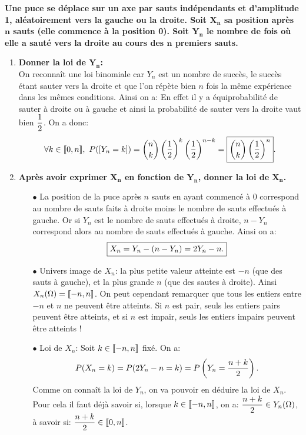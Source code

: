 \documentclass[a4paper, 11pt,reqno]{article}
\begin{document}
\begin{correction}  \;
	\textbf{Une puce se d\'eplace sur un axe par sauts ind\'ependants et d'amplitude 1, al\'eatoirement vers la gauche ou la droite. Soit $\mathbf{X_n}$ sa position apr\`es $\mathbf{n}$ sauts (elle commence \`a la position 0). Soit $\mathbf{Y_n}$ le nombre de fois o\`u elle a saut\'e vers la droite au cours des $\mathbf{n}$ premiers sauts.}
	\begin{enumerate}
		\item \textbf{Donner la loi de $\mathbf{Y_n}$:}\\
		      \noindent On reconna\^{i}t une loi binomiale car $Y_n$ est un nombre de succ\`{e}s, le succ\`{e}s \'etant sauter vers la droite et que l'on r\'ep\`{e}te bien $n$ fois la m\^{e}me exp\'erience dans les m\^{e}mes conditions. Ainsi on a:  En effet il y a \'equiprobabilit\'e de sauter \`{a} droite ou \`{a} gauche et ainsi la probabilit\'e de sauter vers la droite vaut bien $\displaystyle\frac{1}{2}$. On a donc:
		      $$\forall k\in\llbracket  0,n\rrbracket,\ P(\lbrack Y_n=k\rbrack)=\binom{n}{k} \left( \displaystyle\frac{1}{2} \right)^k \left( \displaystyle\frac{1}{2} \right)^{n-k}=\fbox{$\displaystyle\binom{n}{k} \left( \displaystyle\frac{1}{2} \right)^n$}.$$
		\item \textbf{Apr\`es avoir exprimer $\mathbf{X_n}$ en fonction de $\mathbf{Y_n}$, donner la loi de $\mathbf{X_n}$.}
		      \begin{itemize}
			      \item[$\bullet$] La position de la puce apr\`{e}s $n$ sauts en ayant commenc\'e \`{a} 0 correspond au nombre de sauts faits \`{a} droite moins le nombre de sauts effectu\'es \`{a} gauche. Or si $Y_n$ est le nombre de sauts effectu\'es \`{a} droite, $n-Y_n$ correspond alors au nombre de sauts effectu\'es \`{a} gauche. Ainsi on a:
				      $$\fbox{$X_n=Y_n-(n-Y_n)=2Y_n-n.$}$$
			      \item[$\bullet$] Univers image de $X_n$: la plus petite valeur atteinte est $-n$ (que des sauts \`a gauche), et la plus grande $n$ (que des sautes \`a droite). Ainsi $X_n(\Omega) = \llbracket  -n, n \rrbracket$. On peut cependant remarquer que tous les entiers entre $-n$ et $n$ ne peuvent \^etre atteints. Si $n$ est pair, seuls les entiers pairs peuvent \^etre atteints, et si $n$ est impair, seuls les entiers impairs peuvent \^etre atteints !
			      \item[$\bullet$] Loi de $X_n$: Soit $k\in\llbracket  -n,n\rrbracket$ fix\'e. On a:
				      $$P(X_n=k)=P(2Y_n-n=k)=P\left( Y_n=\displaystyle\frac{n+k}{2} \right).$$
				      Comme on conna\^{i}t la loi de $Y_n$, on va pouvoir en d\'eduire la loi de $X_n$. Pour cela il faut d\'ej\`{a} savoir si, lorsque $k\in\llbracket  -n,n\rrbracket$, on a: $\displaystyle\frac{n+k}{2} \in Y_n(\Omega)$, \`{a} savoir si: $\displaystyle\frac{n+k}{2} \in\llbracket  0,n\rrbracket$.

\end{itemize}
\end{enumerate}
\end{correction}
\end{document}
